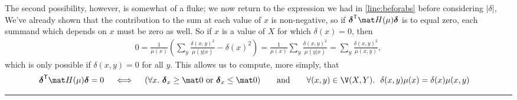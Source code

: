 \begin{lproof}
    The second possibility, however, is somewhat of a fluke; we now return to the expression we had in \eqref{line:beforabs} before considering $|\delta|$, 
    We've already shown that the contribution to the sum at each value of $x$ is non-negative, so if $\bdelta^{\sf T} \mat H(\mu) \bdelta$ is to equal zero, each summand which depends on $x$ must be zero as well.  
    So if $x$ is a value of $X$ for which $\delta(x) = 0$, then
    \begin{align*}
        0 = \frac{1}{\mu(x)} \left( \sum_y \frac{\delta(x,y)^2}{\mu(y|x)} - \delta(x)^2 \right) 
         = \frac{1}{\mu(x)} \sum_y \frac{\delta(x,y)^2}{\mu(y|x)}  
         = \sum_y \frac{\delta(x,y)^2}{\mu(x,y)},
    \end{align*}
    which is only possible if $\delta(x,y) = 0$ for all $y$. 
    This allows us to compute, more simply, that 
    \begin{align*}
        \bdelta^{\sf T} \mat H(\mu) \bdelta = 0
        \quad&\iff\quad 
            (\forall x .~  \bdelta_x \ge \mat 0 \text{ or } \bdelta_x \le \mat 0)
            \qquad\text{and}\qquad 
            \forall (x,y) \in \V(X,Y).~~
                \delta(x,y) \mu(x) = \delta(x) \mu(x,y)
        \end{align*}
    
    \medskip
    \hrule
    \medskip
    

\end{lproof}
